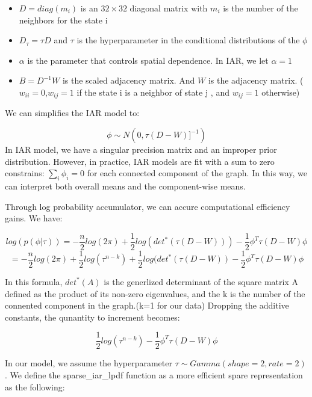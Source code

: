 \documentclass[]{tufte-handout}
\begin{document}
\begin{itemize}
\item
  \(D = diag(m_i)\) is an \(32 \times 32\) diagonal matrix with \(m_i\)
  is the number of the neighbors for the state i
\item
  \(D_{\tau} = \tau D\) and \(\tau\) is the hyperparameter in the
  conditional distributions of the \(\phi\)
\item
  \(\alpha\) is the parameter that controls spatial dependence. In IAR,
  we let \(\alpha =1\)
\item
  \(B = D^{-1} W\) is the scaled adjacency matrix. And \(W\) is the
  adjacency matrix. (\(w_{ii}=0\),\(w_{ij}=1\) if the state i is a
  neighbor of state j , and \(w_{ij}=1\) otherwise)
\end{itemize}

We can simplifies the IAR model to:

\[\phi \sim N(0,\tau (D-W)]^{-1})\] In IAR model, we have a singular
precision matrix and an improper prior distribution. However, in
practice, IAR models are fit with a sum to zero constrains:
\(\sum_{i}\phi_i = 0\) for each connected component of the graph. In
this way, we can interpret both overall means and the component-wise
means.

Through log probability accumulator, we can accure computational
efficiency gains. We have:

\[log(p(\phi | \tau)) = -\frac{n}{2}log(2\pi) + \frac{1}{2}log(det^{*}(\tau(D-W))) - \frac{1}{2}\phi^{T}\tau(D-W)\phi\]
\[=-\frac{n}{2}log(2\pi) + \frac{1}{2}log(\tau^{n-k}) + \frac{1}{2}log(det^{*}(\tau(D-W))  - \frac{1}{2}\phi^{T}\tau(D-W)\phi\]

In this formula, \(det^{*}(A)\) is the generlized determinant of the
square matrix A defined as the product of its non-zero eigenvalues, and
the k is the number of the connented component in the graph.(k=1 for our
data) Dropping the additive constants, the qunantity to increment
becomes:

\[  \frac{1}{2}log(\tau^{n-k}) - \frac{1}{2}\phi^{T}\tau(D-W)\phi \]

In our model, we assume the hyperparameter
\(\tau \sim Gamma(shape = 2,rate = 2)\). We define the sparse\_iar\_lpdf
function as a more efficient spare representation as the following:
\end{document}
